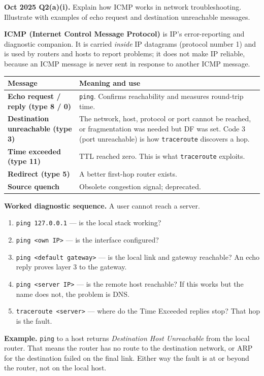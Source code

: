 \documentclass[11pt,a4paper]{article}
\begin{document}
\begin{pyqbox}
\textbf{Oct 2025 Q2(a)(i).} Explain how ICMP works in network troubleshooting. Illustrate with examples of echo request and destination unreachable messages.
\end{pyqbox}

\begin{solbox}
\textbf{ICMP (Internet Control Message Protocol)} is IP's error-reporting and diagnostic companion. It is carried \emph{inside} IP datagrams (protocol number 1) and is used by routers and hosts to report problems; it does not make IP reliable, because an ICMP message is never sent in response to another ICMP message.

\begin{center}\small
\begin{tabularx}{\textwidth}{>{\bfseries}p{} X}
\toprule Message & Meaning and use\\
\midrule
Echo request / reply (type 8 / 0) & \texttt{ping}. Confirms reachability and measures round-trip time.\\
Destination unreachable (type 3) & The network, host, protocol or port cannot be reached, or fragmentation was needed but DF was set. Code 3 (port unreachable) is how \texttt{traceroute} discovers a hop.\\
Time exceeded (type 11) & TTL reached zero. This is what \texttt{traceroute} exploits.\\
Redirect (type 5) & A better first-hop router exists.\\
Source quench & Obsolete congestion signal; deprecated.\\
\bottomrule
\end{tabularx}
\end{center}

\textbf{Worked diagnostic sequence.} A user cannot reach a server.
\begin{enumerate}
\item \texttt{ping 127.0.0.1} --- is the local stack working?
\item \texttt{ping <own IP>} --- is the interface configured?
\item \texttt{ping <default gateway>} --- is the local link and gateway reachable? An echo reply proves layer 3 to the gateway.
\item \texttt{ping <server IP>} --- is the remote host reachable? If this works but the name does not, the problem is DNS.
\item \texttt{traceroute <server>} --- where do the Time Exceeded replies stop? That hop is the fault.
\end{enumerate}

\textbf{Example.} \texttt{ping} to a host returns \emph{Destination Host Unreachable} from the local router. That means the router has no route to the destination network, or ARP for the destination failed on the final link. Either way the fault is at or beyond the router, not on the local host.
\end{solbox}
\end{document}
